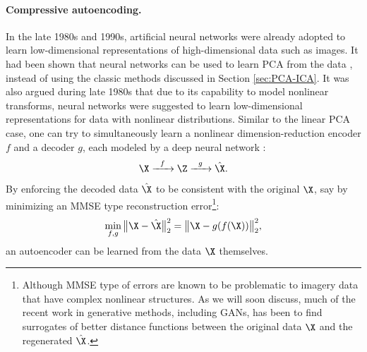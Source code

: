 \documentclass[../../book-main.tex]{subfiles}
\begin{document}
\paragraph{Compressive autoencoding.}
In the late 1980s and 1990s, artificial neural networks were already adopted to learn low-dimensional representations of high-dimensional data such as images. It had been shown that neural networks can be used to learn PCA from the data \cite{Oja1982SimplifiedNM,Baldi89}, instead of using the classic methods discussed in Section \ref{sec:PCA-ICA}. It was also argued during late 1980s that due to its capability to model nonlinear transforms, neural networks were suggested to learn low-dimensional representations for data with nonlinear distributions. Similar to the linear PCA case, one can try to simultaneously learn a nonlinear dimension-reduction encoder $f$ and a decoder $g$, each modeled by a deep neural network  \cite{Rumelhart1986,Kramer1991NonlinearPC}:
\begin{equation}
    \X   \xrightarrow{\hspace{2mm} f \hspace{2mm}} \Z  \xrightarrow{\hspace{2mm} g \hspace{2mm}} \hat \X.
       \label{eqn:auto-encoding-deep-networks}
\end{equation}
By enforcing the decoded data $\hat \X$ to be consistent with the original $\X$, say by minimizing an MMSE type reconstruction error\footnote{Although MMSE type of errors are known to be problematic to imagery data that have complex nonlinear structures. As we will soon discuss, much of the recent work in generative methods, including GANs, has been to find surrogates of better distance functions between the original data $\X$ and the regenerated $\hat \X$.}:
\begin{equation}
    \min_{f,g} \big\|\X - \hat \X\big\|_2^2 = \big\|\X - g(f( \X))\big\|_2^2,
\end{equation}
an autoencoder can be learned from the data $\X$ themselves. 
\end{document}

